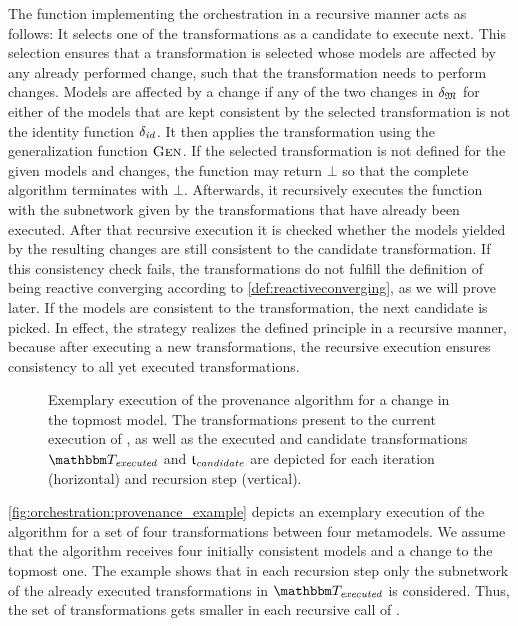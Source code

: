 The function  implementing the orchestration in a recursive manner acts as follows:
It selects one of the transformations as a candidate to execute next.
This selection ensures that a transformation is selected whose models are affected by any already performed change, such that the transformation needs to perform changes.
Models are affected by a change if any of the two changes in $\delta_{\mathfrak{M}}$ for either of the models that are kept consistent by the selected transformation is not the identity function $\delta_{\mathit{id}}$.
It then applies the transformation using the generalization function $\textsc{Gen}_{}$.
If the selected transformation is not defined for the given models and changes, the function may return $\bot$ so that the complete algorithm terminates with $\bot$.
Afterwards, it recursively executes the function  with the subnetwork given by the transformations that have already been executed.
After that recursive execution it is checked whether the models yielded by the resulting changes are still consistent to the candidate transformation.
If this consistency check fails, the transformations do not fulfill the definition of being reactive converging according to \autoref{def:reactiveconverging}, as we will prove later.
If the models are consistent to the transformation, the next candidate is picked.
In effect, the strategy realizes the defined principle in a recursive manner, because after executing a new transformations, the recursive execution ensures consistency to all yet executed transformations.

\begin{figure}
    \centering
    \resizebox{\textwidth}{!}{}
    \caption[Exemplary execution of the provenance algorithm]{%
    Exemplary execution of the provenance algorithm for a change in the topmost model. 
    The transformations present to the current execution of , as well as the executed and candidate transformations $\provalgexecuted$ and $\mathfrak{t}_{\mathit{candidate}}$ are depicted for each iteration (horizontal) and recursion step (vertical).
}
    \label{fig:orchestration:provenance_example}
\end{figure}

\autoref{fig:orchestration:provenance_example} depicts an exemplary execution of the  algorithm for a set of four transformations between four metamodels.
We assume that the algorithm receives four initially consistent models and a change to the topmost one.
The example shows that in each recursion step only the subnetwork of the already executed transformations in $\provalgexecuted$ is considered.
Thus, the set of transformations gets smaller in each recursive call of .


